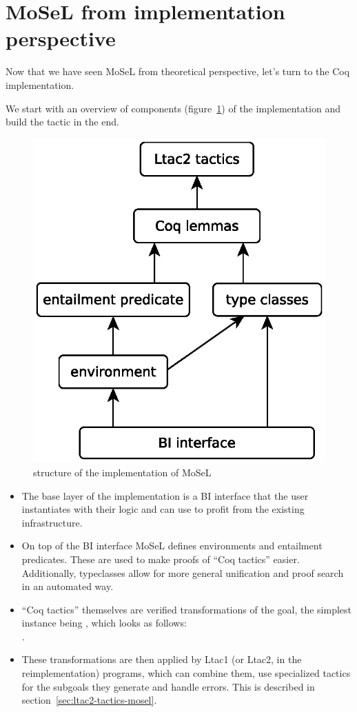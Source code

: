 \section{MoSeL from implementation perspective}
\label{sec:implementation-of-ipm}

Now that we have seen MoSeL from theoretical perspective, let's turn to the Coq implementation.

We start with an overview of components (figure~\ref{fig:ipm-diagram}) of the implementation and build the  tactic in the end.

\begin{figure}
  \centering
  \includegraphics[width=0.5\linewidth]{ipm-diagram}
  \caption{structure of the implementation of MoSeL}
  \label{fig:ipm-diagram}
\end{figure}


\begin{itemize}
\item The base layer of the implementation is a BI interface that the user instantiates with their logic and can use to profit from the existing infrastructure.
\item On top of the BI interface MoSeL defines environments and entailment predicates. These are used to make proofs of ``Coq tactics'' easier.
  Additionally, typeclasses allow for more general unification and proof search in an automated way.
\item ``Coq tactics'' themselves are verified transformations of the goal, the simplest instance being , which looks as follows:\\
.
\item These transformations are then applied by Ltac1 (or Ltac2, in the reimplementation) programs, which can combine them, use specialized tactics for the subgoals they generate and handle errors.
  This is described in section~\ref{sec:ltac2-tactics-mosel}.
\end{itemize}

